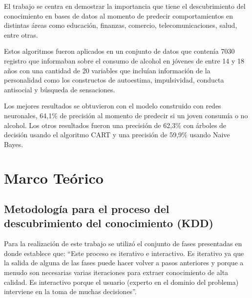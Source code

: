El trabajo se centra en demostrar la importancia que tiene el descubrimiento del conocimiento en bases de datos al momento de predecir comportamientos en distintas áreas como educación, finanzas, comercio, telecomunicaciones, salud, entre otras.

Estos algoritmos fueron aplicados en un conjunto de datos que contenía 7030 registro que informaban sobre el consumo de alcohol en jóvenes de entre 14 y 18 años con una cantidad de 20 variables que incluían información de la personalidad como los constructos de autoestima, impulsividad, conducta antisocial y búsqueda de sensaciones.

Los mejores resultados se obtuvieron con el modelo construido con redes neuronales, 64,1\% de precisión al momento de predecir si un joven consumía o no alcohol. Los otros resultados fueron una precisión de 62,3\% con árboles de decisión usando el algoritmo CART \cite{key-50} y una precisión de 59,9\% usando Naive Bayes.
\section{Marco Teórico}
\subsection{Metodología para el proceso del descubrimiento del conocimiento (KDD)}
Para la realización de este trabajo se utilizó el conjunto de fases presentadas en \cite{key-50} donde establece que: ``Este proceso es iterativo e interactivo. Es iterativo ya que la salida de alguna de las fases puede hacer volver a pasos anteriores y porque a menudo son necesarias varias iteraciones para extraer conocimiento de alta calidad. Es interactivo porque el usuario (experto en el dominio del problema) interviene en la toma de muchas decisiones''.

